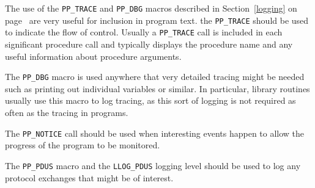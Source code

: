 The use of the \verb|PP_TRACE| and
\verb|PP_DBG| macros described in Section~\ref{logging}
on page~\pageref{logging} are very useful for inclusion in program
text. the \verb|PP_TRACE| should be used to indicate the flow of
control. Usually a \verb|PP_TRACE| call is included in each
significant procedure call and typically displays the procedure name
and any useful information about procedure arguments.

The \verb|PP_DBG| macro is used anywhere that very detailed tracing
might be needed such as printing out individual variables or similar.
In particular, library routines usually use this macro to log tracing,
as this sort of logging is not required as often as the tracing in
programs.

The \verb|PP_NOTICE| call should be used when
interesting events happen to allow the progress of the program to be
monitored.

The \verb|PP_PDUS| macro and the \verb|LLOG_PDUS|
logging level should be used to log any protocol exchanges that might
be of interest.

